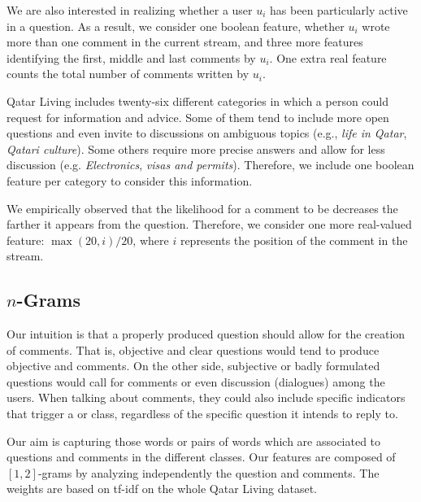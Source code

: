 We are also interested in realizing whether a user $u_i$ has been particularly 
active in a question. As a result, we consider one boolean feature, whether 
$u_i$ wrote more than one comment in the current stream, and three more features 
identifying the first, middle and last comments by $u_i$. One extra real feature 
counts the total number of comments written by $u_i$.

Qatar Living includes twenty-six different categories in which a person could 
request for information and advice. Some of them tend to include more open 
questions and even invite to discussions on ambiguous topics (e.g., \textit{life 
in Qatar}, \textit{Qatari culture}). Some others require more precise answers 
and allow for less discussion (e.g. \textit{Electronics}, \textit{visas and 
permits}). Therefore, we include one boolean feature per category to consider 
this information. 
 
We empirically observed that the likelihood for a comment to be \good decreases 
the farther it appears from the question. Therefore, we consider one more 
real-valued feature: $\max(20, i)/20$, where $i$ represents the position of 
the comment in the stream.
 



\subsection{$n$-Grams }
\label{ssub:ngrams}

Our intuition is that a properly produced question should allow for the creation 
of \good comments. That is, objective and clear questions would tend to produce 
objective and \good comments. On the other side, subjective or badly formulated 
questions would call for \bad comments or even discussion (\ie dialogues) among 
the users. When talking about comments, they could also include 
specific indicators that trigger a \good or \bad class, regardless of the 
specific question it intends to reply to. 

Our aim is capturing those words or pairs of words which are associated to 
questions and comments in the different classes. Our features are composed of 
$[1,2]$-grams by analyzing independently the question and comments. The weights 
are based on tf-idf on the whole Qatar Living dataset. 

